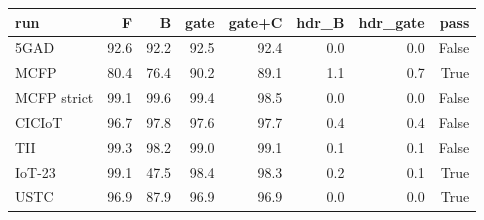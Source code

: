 \begin{tabular}{lrrrrrrr}
\toprule
run & F & B & gate & gate+C & hdr\_B & hdr\_gate & pass \\
\midrule
5GAD & 92.6 & 92.2 & 92.5 & 92.4 & 0.0 & 0.0 & False \\
MCFP & 80.4 & 76.4 & 90.2 & 89.1 & 1.1 & 0.7 & True \\
MCFP strict & 99.1 & 99.6 & 99.4 & 98.5 & 0.0 & 0.0 & False \\
CICIoT & 96.7 & 97.8 & 97.6 & 97.7 & 0.4 & 0.4 & False \\
TII & 99.3 & 98.2 & 99.0 & 99.1 & 0.1 & 0.1 & False \\
IoT-23 & 99.1 & 47.5 & 98.4 & 98.3 & 0.2 & 0.1 & True \\
USTC & 96.9 & 87.9 & 96.9 & 96.9 & 0.0 & 0.0 & True \\
\bottomrule
\end{tabular}
